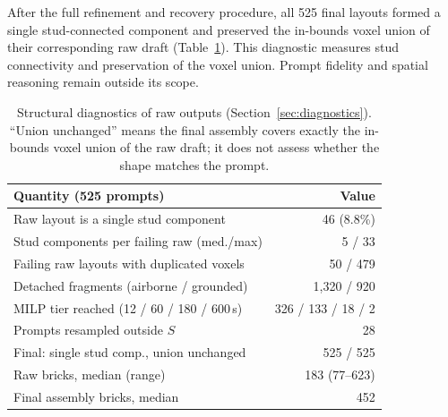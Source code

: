 \documentclass[letterpaper]{article} %
\begin{document}
After the full refinement and recovery procedure, all 525 final layouts formed a single stud-connected component and preserved the in-bounds voxel union of their corresponding raw draft (Table~\ref{tab:diag}). This diagnostic measures stud connectivity and preservation of the voxel union. Prompt fidelity and spatial reasoning remain outside its scope.


\begin{table}[!htbp]
\centering
\small
\setlength{\tabcolsep}{3pt}
\begin{tabular}{lr}
\toprule
Quantity (525 prompts) & Value \\
\midrule
Raw layout is a single stud component & 46 (8.8\%) \\
Stud components per failing raw (med./max) & 5 / 33 \\
Failing raw layouts with duplicated voxels & 50 / 479 \\
Detached fragments (airborne / grounded) & 1,320 / 920 \\
MILP tier reached (12 / 60 / 180 / 600\,s) & 326 / 133 / 18 / 2 \\
Prompts resampled outside $S$ & 28 \\
Final: single stud comp., union unchanged & 525 / 525 \\
Raw bricks, median (range) & 183 (77--623) \\
Final assembly bricks, median & 452 \\
\bottomrule
\end{tabular}
\caption{Structural diagnostics of raw outputs (Section~\ref{sec:diagnostics}). ``Union unchanged'' means the final assembly covers exactly the in-bounds voxel union of the raw draft; it does not assess whether the shape matches the prompt.}
\label{tab:diag}
\end{table}



\end{document}
